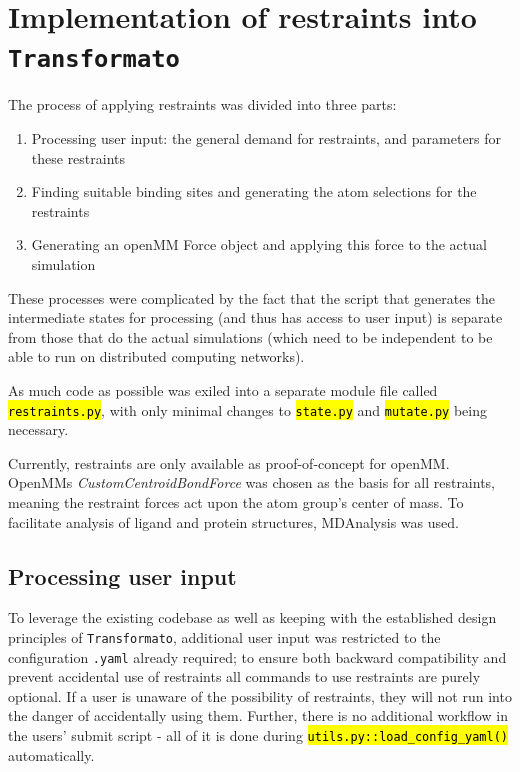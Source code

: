 \documentclass[oneside]{scrreprt}
\newcommand{\code}[1]{\texttt{\hl{#1}}}
\begin{document}
\section{Implementation of restraints into \texttt{Transformato}}\label{sec:implementation_restraints}

The process of applying restraints was divided into three parts:

\begin{enumerate}
    \item Processing user input: the general demand for restraints, and parameters for these restraints
    \item Finding suitable binding sites and generating the atom selections for the restraints
    \item Generating an openMM Force object and applying this force to the actual simulation

\end{enumerate}

These processes were complicated by the fact that the script that generates the intermediate states for processing (and thus has access to user input) is separate from those that do the actual simulations (which need to be independent to be able to run on distributed computing networks).



 As much code as possible was exiled into a separate module file called \code{restraints.py}, with only minimal changes to \code{state.py} and \code{mutate.py} being necessary. 

Currently, restraints are only available as proof-of-concept for openMM. OpenMMs \emph{CustomCentroidBondForce} was chosen as the basis for all restraints, meaning the restraint forces act upon the atom group's center of mass. To facilitate analysis of ligand and protein structures, MDAnalysis\cite{agrawal2011,oliver_beckstein-proc-scipy-2016} was used.

\subsection{Processing user input}
To leverage the existing codebase as well as keeping with the established design principles of \texttt{Transformato}, additional user input was restricted to the configuration \texttt{.yaml} already required; to ensure both backward compatibility and prevent accidental use of restraints all commands to use restraints are purely optional. If a user is unaware of the possibility of restraints, they will not run into the danger of accidentally using them. Further, there is no additional workflow in the users' submit script - all of it is done during \code{utils.py::load\_config\_yaml()} automatically.
\end{document}
